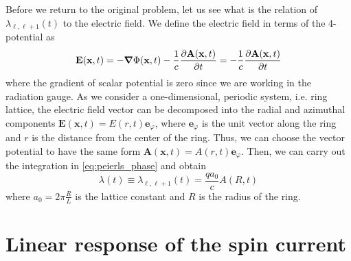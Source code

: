 Before we return to the original problem, let us see what is the relation of \(\lambda_{\ell,\ell+1}(t)\)  to the electric field.
We define the electric field in terms of the 4-potential as
\begin{equation}
    \mathbf{E}(\mathbf{x},t) = -\grad{\Phi(\mathbf{x},t)} - \frac{1}{c} \pdv{\mathbf{A}(\mathbf{x},t)}{t}
    = -\frac{1}{c} \pdv{\mathbf{A} (\mathbf{x},t)}{t}
\end{equation}
where the gradient of scalar potential is zero since we are working in the radiation gauge.
As we consider a one-dimensional, periodic system, i.e. ring lattice, the electric field vector can be decomposed into
the radial and azimuthal components \(\mathbf{E} (\mathbf{x} ,t) = E(r,t)\mathbf{e}_{\varphi}\), where
\(\mathbf{e}_{\varphi }\) is the unit vector along the ring and \(r\) is the distance from the center of the ring.
Thus, we can choose the vector potential to have the same form \(\mathbf{A}(\mathbf{x},t) = A(r,t)\mathbf{e}_{\varphi}\).
Then, we can carry out the integration in \eqref{eq:peierls_phase} and obtain
\begin{equation}
    \lambda(t) \equiv \lambda_{\ell,\ell+1}(t) = \frac{q a_0}{c} A(R,t)
\end{equation}
where \(a_0 = 2\pi \frac{R}{L}\) is the lattice constant and \(R\) is the radius of the ring.

\section{Linear response of the spin current}

